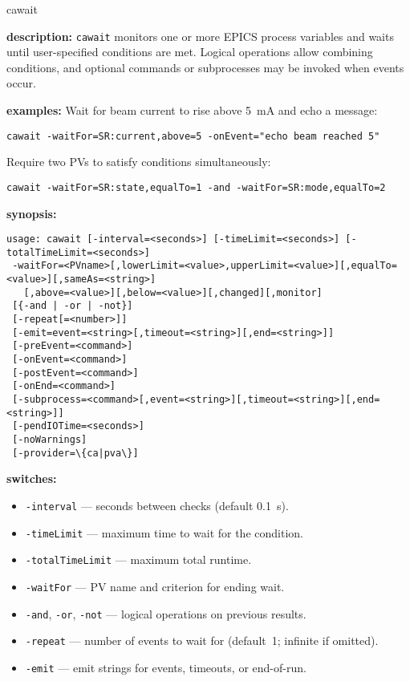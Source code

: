 \begin{sddsprog}{cawait}
\item \textbf{description:}
\verb+cawait+ monitors one or more EPICS process variables and waits until
user-specified conditions are met. Logical operations allow combining
conditions, and optional commands or subprocesses may be invoked when
events occur.
\item \textbf{examples:}
Wait for beam current to rise above 5~mA and echo a message:
\begin{verbatim}
cawait -waitFor=SR:current,above=5 -onEvent="echo beam reached 5"
\end{verbatim}
Require two PVs to satisfy conditions simultaneously:
\begin{verbatim}
cawait -waitFor=SR:state,equalTo=1 -and -waitFor=SR:mode,equalTo=2
\end{verbatim}
\item \textbf{synopsis:}
\begin{verbatim}
usage: cawait [-interval=<seconds>] [-timeLimit=<seconds>] [-totalTimeLimit=<seconds>]
 -waitFor=<PVname>[,lowerLimit=<value>,upperLimit=<value>][,equalTo=<value>][,sameAs=<string>]
   [,above=<value>][,below=<value>][,changed][,monitor]
 [{-and | -or | -not}]
 [-repeat[=<number>]]
 [-emit=event=<string>[,timeout=<string>][,end=<string>]]
 [-preEvent=<command>]
 [-onEvent=<command>]
 [-postEvent=<command>]
 [-onEnd=<command>]
 [-subprocess=<command>[,event=<string>][,timeout=<string>][,end=<string>]]
 [-pendIOTime=<seconds>]
 [-noWarnings]
 [-provider=\{ca|pva\}]
\end{verbatim}
\item \textbf{switches:}
\begin{itemize}
  \item {\tt -interval} --- seconds between checks (default 0.1~s).
  \item {\tt -timeLimit} --- maximum time to wait for the condition.
  \item {\tt -totalTimeLimit} --- maximum total runtime.
  \item {\tt -waitFor} --- PV name and criterion for ending wait.
  \item {\tt -and}, {\tt -or}, {\tt -not} --- logical operations on previous results.
  \item {\tt -repeat} --- number of events to wait for (default~1; infinite if omitted).
  \item {\tt -emit} --- emit strings for events, timeouts, or end-of-run.

\end{itemize}
\end{sddsprog}
